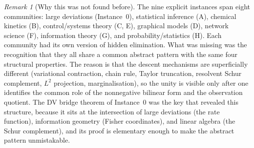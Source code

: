 \documentclass[11pt,a4paper]{article}
\numberwithin{equation}{section}
\theoremstyle{thmcompact}
\theoremstyle{remark}
\newtheorem*{remarkplain}{Remark}
\newenvironment{remark}[1][]%
{\begin{remarkbox}\begin{remarkplain}[#1]\normalfont}
		{\end{remarkplain}\end{remarkbox}}
\begin{document}
\begin{remark}[Why this was not found before]\label{rem:why-not}
The nine explicit instances span eight communities: large deviations (Instance~0), statistical inference (A), chemical kinetics (B), control/systems theory (C, E), graphical models (D), network science (F), information theory (G), and probability/statistics (H). Each community had its own version of hidden elimination. What was missing was the recognition that they all share a common abstract pattern with the same four structural properties. The reason is that the descent mechanisms are superficially different (variational contraction, chain rule, Taylor truncation, resolvent Schur complement, $L^2$ projection, marginalisation), so the unity is visible only after one identifies the common role of the nonnegative bilinear form and the observation quotient. The DV bridge theorem of Instance~0 was the key that revealed this structure, because it sits at the intersection of large deviations (the rate function), information geometry (Fisher coordinates), and linear algebra (the Schur complement), and its proof is elementary enough to make the abstract pattern unmistakable.
\end{remark}
\end{document}
